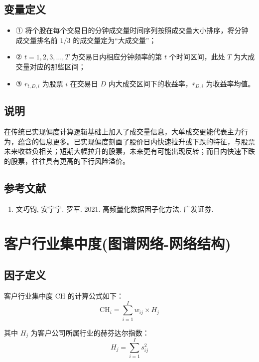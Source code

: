 \documentclass{article}
\begin{document}
\subsection{变量定义}
\begin{itemize}
    \item ① 将个股在每个交易日的分钟成交量时间序列按照成交量大小排序，将分钟成交量排名前 \(1/3\) 的成交量定为“大成交量”；
    \item ② \(t=1,2,3,\ldots,T\) 为交易日内相应分钟频率的第 \(t\) 个时间区间，此处 \(T\) 为大成交量对应的那些区间；
    \item ③ \( r_{t,D,i} \) 为股票 \(i\) 在交易日 \(D\) 内大成交区间下的收益率，\(\bar{r}_{D,i}\) 为收益率均值。
\end{itemize}

\subsection{说明}
在传统已实现偏度计算逻辑基础上加入了成交量信息，大单成交更能代表主力行为，蕴含的信息更多。已实现偏度刻画了股价日内快速拉升或下跌的特征，与股票未来收益负相关；短期大幅拉升的股票，未来更有可能出现反转；而日内快速下跌的股票，往往具有更高的下行风险溢价。

\subsection{参考文献}
\begin{enumerate}
    \item 文巧钧, 安宁宁, 罗军. 2021. 高频量化数据因子化方法. 广发证券.
\end{enumerate}

\section{客户行业集中度(图谱网络-网络结构)}

\subsection{因子定义}


客户行业集中度 \( \mathrm{CH} \) 的计算公式如下：
\begin{equation}
    \mathrm{CH}_i = \sum_{i=1}^{I} w_{ij} \times H_j
\end{equation}

其中 \( H_j \) 为客户公司所属行业的赫芬达尔指数：
\begin{equation}
    H_j = \sum_{i=1}^{I} s_{ij}^2
\end{equation}
\end{document}
